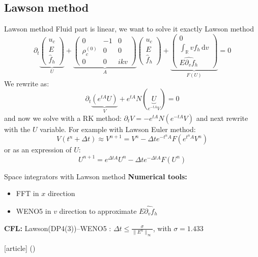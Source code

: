 \documentclass{beamer}
\newcommand{\cmark}{{\color{dgreen}\ding{52}}}
\newcommand{\arrow}{{\color{PLB}\ding{220}}}
\newcommand{\mbold}[1]{{\textbf{\color{PLB}#1}}}
\newcommand{\customcite}[1]{\citeauthor{#1} (\citeyear{#1})}
\begin{document}
\subsection{Lawson method}
\begin{frame}{Lawson method}
  Fluid part is linear, we want to solve it exactly \arrow Lawson method
  $$
    \partial_t \underbrace{\begin{pmatrix}
      u_c\\E\\\hat{f}_h
    \end{pmatrix}}_{U} + \underbrace{\begin{pmatrix}
      0 & -1 & 0 \\ \rho_c^{(0)} & 0 & 0 \\ 0 & 0 & ikv
    \end{pmatrix}}_{A} \begin{pmatrix}
      u_c\\E\\\hat{f}_h
    \end{pmatrix} + \underbrace{\begin{pmatrix}
      0\\\int_\mathbb{R}vf_h\,\mathrm{d}v \\\widehat{E\partial_vf_h}
    \end{pmatrix}}_{F(U)} = 0
  $$
  We rewrite as:
  $$
    \partial_t\underbrace{\left(e^{tA}U\right)}_{V} + e^{tA}N(\underbrace{U}_{e^{-tA}V}) = 0
  $$
  and now we solve with a RK method: $\partial_tV = -e^{tA}N(e^{-tA}V)$ and next rewrite with the $U$ variable. For example with Lawson Euler method:
  $$
    V(t^n+\Delta t) \approx V^{n+1} = V^n - \Delta t e^{-t^nA}F(e^{t^nA}V^n)
  $$
  or as an expression of $U$:
  $$
    U^{n+1} = e^{\Delta t A}U^n - \Delta te^{-\Delta t A}F(U^n)
  $$
\end{frame}

\begin{frame}{Space integrators with Lawson method}
  \mbold{Numerical tools:}
  \begin{itemize}
    \item FFT in $x$ direction
    \item WENO5 in $v$ direction to approximate $\widehat{E\partial_vf_h}$
  \end{itemize}

  \mbold{CFL:} Lawson(DP4(3))--WENO5 : $\Delta t\leq\frac{\sigma}{\|E^n\|_\infty}$, with $\sigma=1.433$
  \begin{thebibliography}{9}
    [article]
     \customcite{Crouseilles:2019b}
  \end{thebibliography}
\end{frame}
\end{document}
